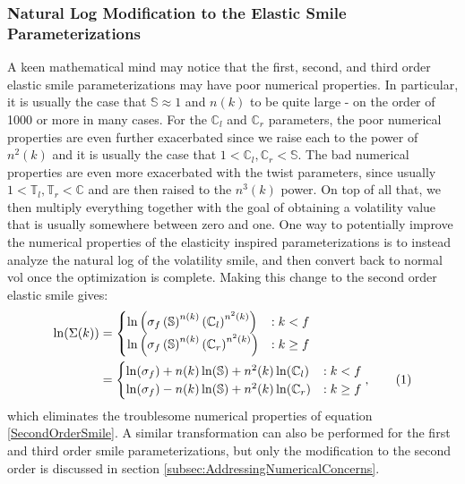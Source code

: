 \documentclass[12pt, a4paper, notitlepage]{article}
\numberwithin{equation}{subsection}
\numberwithin{figure}{subsection}
\numberwithin{table}{subsection}
\newcommand\numberthis{\addtocounter{equation}{1}\tag{\theequation}}
\newcommand{\newpar}{\newline \newline}
\begin{document}
\subsubsection{Natural Log Modification to the Elastic Smile Parameterizations}
\label{subsec:NatLogElasticMod}
A keen mathematical mind may notice that the first, second, and third order elastic smile parameterizations may have poor numerical properties.  In particular, it is usually the case that $\mathbb{S} \approx 1$ and $n(k)$ to be quite large - on the order of 1000 or more in many cases.  For the $\mathbb{C}_l$ and $\mathbb{C}_r$ parameters, the poor numerical properties are even further exacerbated since we raise each to the power of $n^{2}(k)$ and it is usually the case that $1 < \mathbb{C}_l,\mathbb{C}_r < \mathbb{S}$.  The bad numerical properties are even more exacerbated with the twist parameters, since usually $1 < \mathbb{T}_l,\mathbb{T}_r < \mathbb{C}$ and are then raised to the $n^{3}(k)$ power.  On top of all that, we then multiply everything together with the goal of obtaining a volatility value that is usually somewhere between zero and one.
\newpar
One way to potentially improve the numerical properties of the elasticity inspired parameterizations is to instead analyze the natural log of the volatility smile, and then convert back to normal vol once the optimization is complete.  Making this change to the second order elastic smile gives:
\begin{align*}
\ln(\Sigma(k)) 
&= 		\begin{cases}
			\ln\left(\sigma_f\left(\mathbb{S}\right)^{n(k)}\left(\mathbb{C}_l\right)^{n^{2}(k)}\right) & : k < f	\\
            \ln\left(\sigma_f\left(\mathbb{S}\right)^{n(k)}\left(\mathbb{C}_r\right)^{n^{2}(k)}\right) & : k \geq f	\\
        \end{cases} \\
&=		\begin{cases}
			\ln(\sigma_f) + n(k)\ln(\mathbb{S}) + n^{2}(k)\ln(\mathbb{C}_l) & : k < f	\\	
            \ln(\sigma_f) - n(k)\ln(\mathbb{S}) + n^{2}(k)\ln(\mathbb{C}_r) & : k \geq f	\\
        \end{cases}, \numberthis
\end{align*}
\label{SecondOrderSmileNaturalLog}
\newline
which eliminates the troublesome numerical properties of equation \ref{SecondOrderSmile}.  A similar transformation can also be performed for the first and third order smile parameterizations, but only the modification to the second order is discussed in section \ref{subsec:AddressingNumericalConcerns}.
\end{document}
